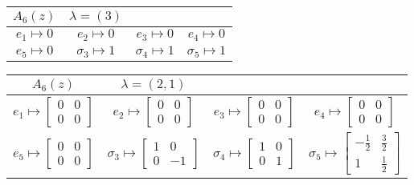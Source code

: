 \documentclass[11pt,a4paper,reqno,svgnames]{amsart}
\theoremstyle{plain}
\theoremstyle{definition}
\numberwithin{equation}{section}
\begin{document}
\begin{landscape}
\begin{table}[hhh]
\begin{tabular}{ll}
\medskip\\
\bottomrule
\end{tabular}
\end{table}

\end{landscape}
 
\newpage

\vfill

\begin{table}[hhh]
\centering
\begin{tabular}{cccc}
 \toprule
 $A_{6}(z)$ & $\lambda=(3)$\\
 \midrule
 $e_1\mapsto 0$ & $e_2\mapsto 0$ & $e_3\mapsto 0$ & $e_4\mapsto 0$\\
$e_5\mapsto 0$ & $\sigma_3\mapsto 1$ &$\sigma_4\mapsto 1$ &$\sigma_5\mapsto 1$
\medskip\\
\bottomrule
\end{tabular}
\end{table}

\begin{table}[hhh]
\centering
\begin{tabular}{cccc}
 \toprule
 $A_{6}(z)$ & $\lambda=(2,1)$ \\
 \midrule
 $e_1\mapsto 
 \begin{bmatrix}
 0 & 0 \\ 0 & 0
 \end{bmatrix}$ & 
 $e_2\mapsto  
 \begin{bmatrix}
 0 & 0 \\ 0 & 0
 \end{bmatrix}$ & 
 $e_3\mapsto  
 \begin{bmatrix}
 0 & 0 \\ 0 & 0
 \end{bmatrix}$ & 
 $e_4\mapsto  
 \begin{bmatrix}
 0 & 0 \\ 0 & 0
 \end{bmatrix}$\medskip \\
 $e_5\mapsto  
 \begin{bmatrix}
 0 & 0 \\ 0 & 0
 \end{bmatrix}$ & 
 $\sigma_3\mapsto  
 \begin{bmatrix}
 1 & 0 \\ 0 & -1
 \end{bmatrix}$ &
 $\sigma_4\mapsto  
 \begin{bmatrix}
 1 & 0 \\ 0 & 1
 \end{bmatrix}$ &
 $\sigma_5\mapsto 
  \begin{bmatrix}
 -\frac{1}{2} & \frac{3}{2} \\ 1 & \frac{1}{2}
 \end{bmatrix}$
\medskip\\
\bottomrule
\end{tabular}
\end{table}
\end{document}
